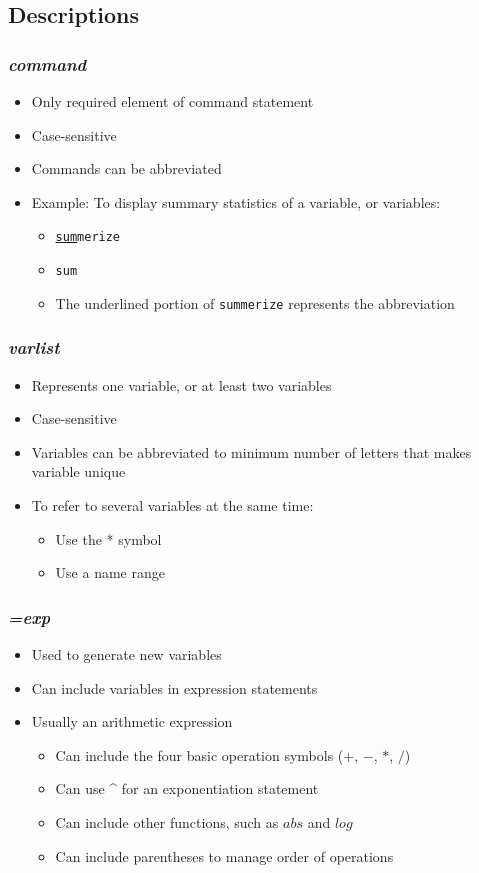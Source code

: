 \documentclass{beamer}
\begin{document}
\subsection{Descriptions}

\begin{frame}
	\frametitle{\textit{command}}
		\begin{itemize}
			\item Only required element of command statement
			\item Case-sensitive
			\item Commands can be abbreviated
			\item Example: To display summary statistics of a variable, or variables:
			\begin{itemize}
				\item \texttt{\underline{sum}merize}
				\item \texttt{sum}
				\item The underlined portion of \texttt{summerize} represents the abbreviation
			\end{itemize}
		\end{itemize}
\end{frame}

\begin{frame}
	\frametitle{\textit{varlist}}
		\begin{itemize}
			\item Represents one variable, or at least two variables
			\item Case-sensitive
			\item Variables can be abbreviated to minimum number of letters that makes variable unique
			\item To refer to several variables at the same time:
				\begin{itemize}
					\item Use the * symbol
					\item Use a name range
				\end{itemize}
		\end{itemize}
\end{frame}

\begin{frame}
	\frametitle{\textit{=exp}}
		\begin{itemize}
			\item Used to generate new variables
			\item Can include variables in expression statements
			\item Usually an arithmetic expression
				\begin{itemize}
					\item Can include the four basic operation symbols ($+$, $-$, $*$, $/$)
					\item Can use \^{} for an exponentiation statement
					\item Can include other functions, such as $abs$ and $log$
					\item Can include parentheses to manage order of operations
				\end{itemize}
		\end{itemize}
\end{frame}
\end{document}

